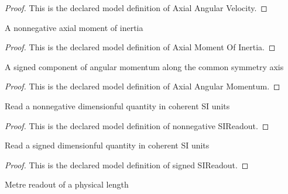 \begin{proof}
  This is the declared model definition of Axial Angular Velocity.
\end{proof}
\begin{definition}
  \label{def:physics:phyx-mini-0712:phyxminiproblems-problemphyxmini0712-axialmomentofinertia}
  A nonnegative axial moment of inertia
\end{definition}
\begin{proof}
  This is the declared model definition of Axial Moment Of Inertia.
\end{proof}
\begin{definition}
  \label{def:physics:phyx-mini-0712:phyxminiproblems-problemphyxmini0712-axialangularmomentum}
  A signed component of angular momentum along the common symmetry axis
\end{definition}
\begin{proof}
  This is the declared model definition of Axial Angular Momentum.
\end{proof}
\begin{definition}
  \label{def:physics:phyx-mini-0712:phyxminiproblems-problemphyxmini0712-nonnegativesireadout}
  Read a nonnegative dimensionful quantity in coherent SI units
\end{definition}
\begin{proof}
  This is the declared model definition of nonnegative SIReadout.
\end{proof}
\begin{definition}
  \label{def:physics:phyx-mini-0712:phyxminiproblems-problemphyxmini0712-signedsireadout}
  Read a signed dimensionful quantity in coherent SI units
\end{definition}
\begin{proof}
  This is the declared model definition of signed SIReadout.
\end{proof}
\begin{definition}
  \label{def:physics:phyx-mini-0712:phyxminiproblems-problemphyxmini0712-lengthinmeters}
  Metre readout of a physical length
\end{definition}
